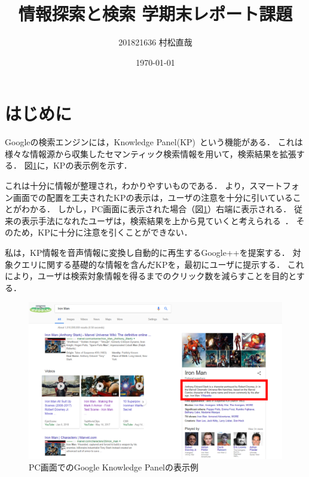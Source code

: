 \documentclass[pdflatex,ja=standard]{bxjsarticle}
\title{情報探索と検索 学期末レポート課題}
\author{201821636 村松直哉}
\date{\today}
\begin{document}
\maketitle
%
%



\section{はじめに}
Googleの検索エンジンには，{\rm Knowledge Panel}(KP)~\cite{Amit2012}という機能がある．
これは様々な情報源から収集したセマンティック検索情報を用いて，検索結果を拡張する．
図\ref{fig:knowledgepanel}に，KPの表示例を示す．

これは十分に情報が整理され，わかりやすいものである．
\cite{Lagun}より，スマートフォン画面での配置を工夫されたKPの表示は，ユーザの注意を十分に引いていることがわかる．
しかし，PC画面に表示された場合（図\ref{fig:knowledgepanel}）右端に表示される．
従来の表示手法になれたユーザは，検索結果を上から見ていくと考えられる~\cite{Granka2004}．
そのため，KPに十分に注意を引くことができない．

私は，KP情報を音声情報に変換し自動的に再生する{\rm Google++}を提案する．
対象クエリに関する基礎的な情報を含んだKPを，最初にユーザに提示する．
これにより，ユーザは検索対象情報を得るまでのクリック数を減らすことを目的とする．

\begin{figure}[htb]
\begin{center}
    \includegraphics[width=14cm]{figs/ironman.png}
\end{center}
\caption{PC画面でのGoogle Knowledge Panelの表示例}
\label{fig:knowledgepanel}
\end{figure}
\end{document}
